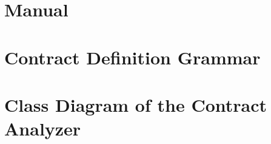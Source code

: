 \chapter{Manual}
\label{manual}


\chapter{Contract Definition Grammar}
\label{appGrammar}


\chapter{Class Diagram of the Contract Analyzer}
\label{diagram}

